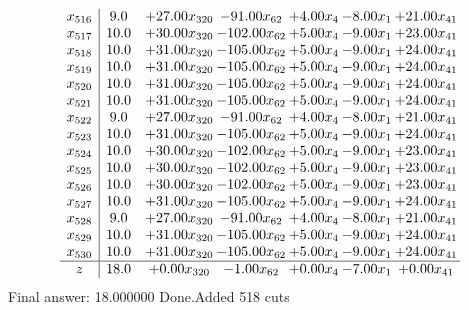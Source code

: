 \documentclass[8pt]{article}
\begin{document}
\[\begin{array}{c| c c@{\hskip 2pt} c@{\hskip 2pt} c@{\hskip 2pt} c@{\hskip 2pt} c@{\hskip 2pt} }
 x_{516}   &  9.0 & + 27.00 x_{320} & -91.00 x_{62} & +  4.00 x_{4} & -8.00 x_{1} & + 21.00 x_{41}\\
 x_{517}   &  10.0 & + 30.00 x_{320} & -102.00 x_{62} & +  5.00 x_{4} & -9.00 x_{1} & + 23.00 x_{41}\\
 x_{518}   &  10.0 & + 31.00 x_{320} & -105.00 x_{62} & +  5.00 x_{4} & -9.00 x_{1} & + 24.00 x_{41}\\
 x_{519}   &  10.0 & + 31.00 x_{320} & -105.00 x_{62} & +  5.00 x_{4} & -9.00 x_{1} & + 24.00 x_{41}\\
 x_{520}   &  10.0 & + 31.00 x_{320} & -105.00 x_{62} & +  5.00 x_{4} & -9.00 x_{1} & + 24.00 x_{41}\\
 x_{521}   &  10.0 & + 31.00 x_{320} & -105.00 x_{62} & +  5.00 x_{4} & -9.00 x_{1} & + 24.00 x_{41}\\
 x_{522}   &  9.0 & + 27.00 x_{320} & -91.00 x_{62} & +  4.00 x_{4} & -8.00 x_{1} & + 21.00 x_{41}\\
 x_{523}   &  10.0 & + 31.00 x_{320} & -105.00 x_{62} & +  5.00 x_{4} & -9.00 x_{1} & + 24.00 x_{41}\\
 x_{524}   &  10.0 & + 30.00 x_{320} & -102.00 x_{62} & +  5.00 x_{4} & -9.00 x_{1} & + 23.00 x_{41}\\
 x_{525}   &  10.0 & + 30.00 x_{320} & -102.00 x_{62} & +  5.00 x_{4} & -9.00 x_{1} & + 23.00 x_{41}\\
 x_{526}   &  10.0 & + 30.00 x_{320} & -102.00 x_{62} & +  5.00 x_{4} & -9.00 x_{1} & + 23.00 x_{41}\\
 x_{527}   &  10.0 & + 31.00 x_{320} & -105.00 x_{62} & +  5.00 x_{4} & -9.00 x_{1} & + 24.00 x_{41}\\
 x_{528}   &  9.0 & + 27.00 x_{320} & -91.00 x_{62} & +  4.00 x_{4} & -8.00 x_{1} & + 21.00 x_{41}\\
 x_{529}   &  10.0 & + 31.00 x_{320} & -105.00 x_{62} & +  5.00 x_{4} & -9.00 x_{1} & + 24.00 x_{41}\\
 x_{530}   &  10.0 & + 31.00 x_{320} & -105.00 x_{62} & +  5.00 x_{4} & -9.00 x_{1} & + 24.00 x_{41}\\
\hline
z    &  18.0 & +  0.00 x_{320} & -1.00 x_{62} & +  0.00 x_{4} & -7.00 x_{1} & +  0.00 x_{41}\\
\end{array}\]
 Final answer: 18.000000 
Done.Added 518 cuts 
\end{document}
